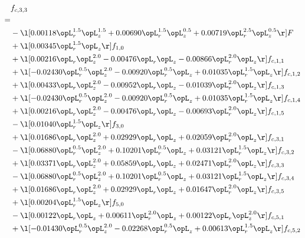 \begin{alignat}{2} 
\label{eq:f_33_1} 
& f_{c,3,3} \nonumber \\ 
 = \\ 
& - \l[  0.00118 \opL_r^{1.5} \opL_z^{1.5} +  0.00690 \opL_r^{1.5} \opL_z^{0.5} +  0.00719 \opL_r^{2.5} \opL_z^{0.5}  \r] F \nonumber \\ 
& + \l[  0.00345 \opL_r^{1.5} \opL_z  \r] f_{1,0} \nonumber \\ 
& + \l[  0.00216 \opL_r \opL_z^{2.0}   -0.00476 \opL_r \opL_z   -0.00866 \opL_r^{2.0} \opL_z  \r] f_{c,1,1} \nonumber \\ 
& + \l[  -0.02430 \opL_r^{0.5} \opL_z^{2.0}   -0.00920 \opL_r^{0.5} \opL_z +  0.01035 \opL_r^{1.5} \opL_z  \r] f_{c,1,2} \nonumber \\ 
& + \l[  0.00433 \opL_r \opL_z^{2.0}   -0.00952 \opL_r \opL_z   -0.01039 \opL_r^{2.0} \opL_z  \r] f_{c,1,3} \nonumber \\ 
& + \l[  -0.02430 \opL_r^{0.5} \opL_z^{2.0}   -0.00920 \opL_r^{0.5} \opL_z +  0.01035 \opL_r^{1.5} \opL_z  \r] f_{c,1,4} \nonumber \\ 
& + \l[  0.00216 \opL_r \opL_z^{2.0}   -0.00476 \opL_r \opL_z   -0.00693 \opL_r^{2.0} \opL_z  \r] f_{c,1,5} \nonumber \\ 
& - \l[  0.01040 \opL_r^{1.5} \opL_z  \r] f_{3,0} \nonumber \\ 
& + \l[  0.01686 \opL_r \opL_z^{2.0} +  0.02929 \opL_r \opL_z +  0.02059 \opL_r^{2.0} \opL_z  \r] f_{c,3,1} \nonumber \\ 
& - \l[  0.06880 \opL_r^{0.5} \opL_z^{2.0} +  0.10201 \opL_r^{0.5} \opL_z +  0.03121 \opL_r^{1.5} \opL_z  \r] f_{c,3,2} \nonumber \\ 
& + \l[  0.03371 \opL_r \opL_z^{2.0} +  0.05859 \opL_r \opL_z +  0.02471 \opL_r^{2.0} \opL_z  \r] f_{c,3,3} \nonumber \\ 
& - \l[  0.06880 \opL_r^{0.5} \opL_z^{2.0} +  0.10201 \opL_r^{0.5} \opL_z +  0.03121 \opL_r^{1.5} \opL_z  \r] f_{c,3,4} \nonumber \\ 
& + \l[  0.01686 \opL_r \opL_z^{2.0} +  0.02929 \opL_r \opL_z +  0.01647 \opL_r^{2.0} \opL_z  \r] f_{c,3,5} \nonumber \\ 
& + \l[  0.00204 \opL_r^{1.5} \opL_z  \r] f_{5,0} \nonumber \\ 
& - \l[  0.00122 \opL_r \opL_z +  0.00611 \opL_r^{2.0} \opL_z +  0.00122 \opL_r \opL_z^{2.0}  \r] f_{c,5,1} \nonumber \\ 
& + \l[  -0.01430 \opL_r^{0.5} \opL_z^{2.0}   -0.02268 \opL_r^{0.5} \opL_z +  0.00613 \opL_r^{1.5} \opL_z  \r] f_{c,5,2} \nonumber \\ 

\end{alignat}
